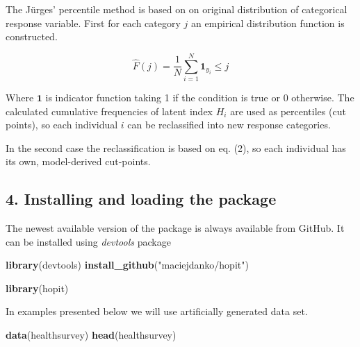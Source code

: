 \documentclass[]{article}
\newenvironment{Shaded}{\begin{snugshade}}{\end{snugshade}}
\newcommand{\KeywordTok}[1]{\textcolor[rgb]{0.13,0.29,0.53}{\textbf{#1}}}
\newcommand{\NormalTok}[1]{#1}
\newcommand{\StringTok}[1]{\textcolor[rgb]{0.31,0.60,0.02}{#1}}
\begin{document}
The Jürges' percentile method is based on on original distribution of
categorical response variable. First for each category \(j\) an
empirical distribution function is constructed.

\begin{equation}
\label{eq:11}
\hat{F}(j) = \frac{1}{N}\sum_{i=1}^N \textbf{1}_{y_i} \leq j
\end{equation}

Where \(\textbf{1}\) is indicator function taking 1 if the condition is
true or 0 otherwise. The calculated cumulative frequencies of latent
index \(H_i\) are used as percentiles (cut points), so each individual
\(i\) can be reclassified into new response categories.

In the second case the reclassification is based on eq. (2), so each
individual has its own, model-derived cut-points.

\hypertarget{installing-and-loading-the-package}{%
\subsection{4. Installing and loading the
package}\label{installing-and-loading-the-package}}

The newest available version of the package is always available from
GitHub. It can be installed using \emph{devtools} package

\begin{Shaded}
\begin{Highlighting}[]
\KeywordTok{library}\NormalTok{(devtools)}
\KeywordTok{install_github}\NormalTok{(}\StringTok{"maciejdanko/hopit"}\NormalTok{)}
\end{Highlighting}
\end{Shaded}

\begin{Shaded}
\begin{Highlighting}[]
\KeywordTok{library}\NormalTok{(hopit)}
\end{Highlighting}
\end{Shaded}

In examples presented below we will use artificially generated data set.

\begin{Shaded}
\begin{Highlighting}[]
\KeywordTok{data}\NormalTok{(healthsurvey)}
\KeywordTok{head}\NormalTok{(healthsurvey)}
\end{Highlighting}
\end{Shaded}
\end{document}
